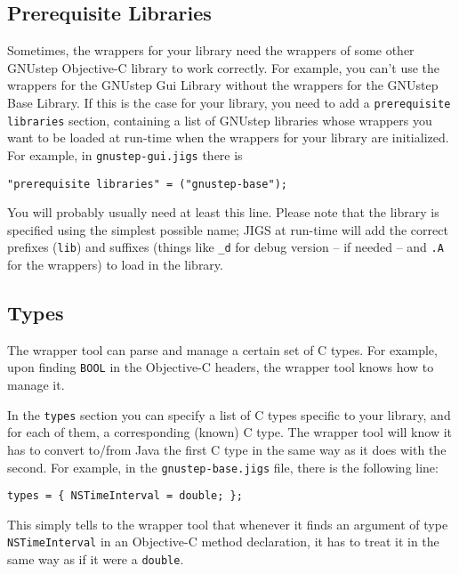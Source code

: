\subsection{Prerequisite Libraries}
Sometimes, the wrappers for your library need the wrappers of some
other GNUstep Objective-C library to work correctly.  For example, you
can't use the wrappers for the GNUstep Gui Library without the
wrappers for the GNUstep Base Library.  If this is the case for your
library, you need to add a \texttt{prerequisite libraries} section,
containing a list of GNUstep libraries whose wrappers you want to be
loaded at run-time when the wrappers for your library are initialized.
For example, in \texttt{gnustep-gui.jigs} there is
\begin{verbatim}
"prerequisite libraries" = ("gnustep-base");
\end{verbatim}
You will probably usually need at least this line.  Please note that
the library is specified using the simplest possible name; JIGS at
run-time will add the correct prefixes (\texttt{lib}) and suffixes
(things like \texttt{\_d} for debug version -- if needed -- and
\texttt{.A} for the wrappers) to load in the library.

\subsection{Types}
The wrapper tool can parse and manage a certain set of C types.  For
example, upon finding \texttt{BOOL} in the Objective-C headers, the
wrapper tool knows how to manage it.

In the \texttt{types} section you can specify a list of C types
specific to your library, and for each of them, a corresponding
(known) C type.  The wrapper tool will know it has to convert to/from
Java the first C type in the same way as it does with the second.  For
example, in the \texttt{gnustep-base.jigs} file, there is the
following line:
\begin{verbatim}
types = { NSTimeInterval = double; };
\end{verbatim}
This simply tells to the wrapper tool that whenever it finds an argument 
of type \texttt{NSTimeInterval} in an Objective-C method declaration, it 
has to treat it in the same way as if it were a \texttt{double}.

